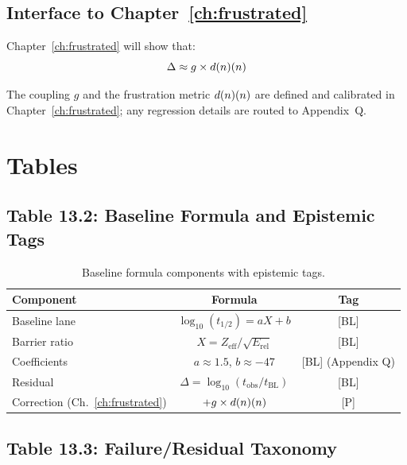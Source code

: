 \subsection{Interface to Chapter~\ref{ch:frustrated}}

Chapter~\ref{ch:frustrated} will show that:
\begin{equation}
    \Delta \approx g \times d(n)(n)
    \label{eq:delta_d}
\end{equation}

The coupling $g$ and the frustration metric $d(n)(n)$ are defined
and calibrated in Chapter~\ref{ch:frustrated}; any regression details are
routed to Appendix~Q. \tagP

\section{Tables}
\label{sec:gn:tables}

\subsection{Table 13.2: Baseline Formula and Epistemic Tags}

\begin{table}[h]
\centering
\caption{Baseline formula components with epistemic tags.}
\label{tab:formula}
\begin{tabular}{lcc}
    \toprule
    Component & Formula & Tag \\
    \midrule
    Baseline lane & $\log_{10}(t_{1/2}) = a X + b$ & [BL] \\
    Barrier ratio & $X = Z_{\text{eff}}/\sqrt{E_{\text{rel}}}$ & [BL] \\
    Coefficients & $a \approx 1.5$, $b \approx -47$ & [BL] (Appendix Q) \\
    Residual & $\Delta = \log_{10}(t_{\text{obs}}/t_{\text{BL}})$ & [BL] \\
    Correction (Ch.~\ref{ch:frustrated}) & $+ g \times d(n)(n)$ & [P] \\
    \bottomrule
\end{tabular}
\end{table}

\subsection{Table 13.3: Failure/Residual Taxonomy}

